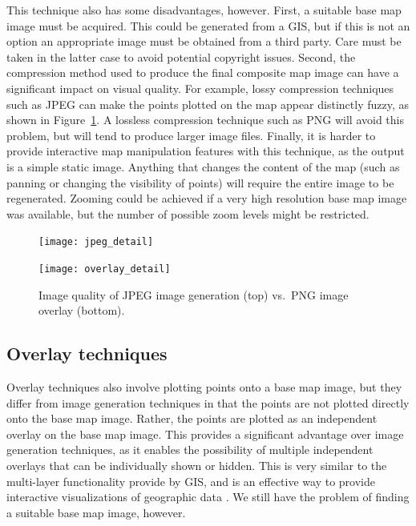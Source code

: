 \documentclass[acmtocl,acmnow]{acmtrans2m}
\begin{document}
This technique also has some disadvantages, however. First, a suitable
base map image must be acquired. This could be generated from a GIS, but
if this is not an option an appropriate image must be obtained from a
third party. Care must be taken in the latter case to avoid potential
copyright issues. Second, the compression method used to produce the
final composite map image can have a significant impact on visual
quality. For example, lossy compression techniques such as JPEG can make
the points plotted on the map appear distinctly fuzzy, as shown in
Figure~\ref{fig-image-quality}. A lossless compression technique such as
PNG will avoid this problem, but will tend to produce larger image
files. Finally, it is harder to provide interactive map manipulation
features with this technique, as the output is a simple static image.
Anything that changes the content of the map (such as panning or
changing the visibility of points) will require the entire image to be
regenerated. Zooming could be achieved if a very high resolution base
map image was available, but the number of possible zoom levels might be
restricted.


\begin{figure}
	\begin{center}
		\texttt{[image: jpeg\_detail]}\medskip
		
		\texttt{[image: overlay\_detail]}
	\end{center}
	\caption{Image quality of JPEG image generation (top) vs.\ PNG image
	overlay (bottom).}
	\label{fig-image-quality}
\end{figure}


\subsection{Overlay techniques}
\label{sec-html-overlay}


Overlay techniques also involve plotting points onto a base map image,
but they differ from image generation techniques in that the points are
not plotted directly onto the base map image. Rather, the points are
plotted as an independent overlay on the base map image. This provides a
significant advantage over image generation techniques, as it enables
the possibility of multiple independent overlays that can be
individually shown or hidden. This is very similar to the multi-layer
functionality provide by GIS, and is an effective way to provide
interactive visualizations of geographic data
\cite{Wood-J-1996-vis,MacE-AM-1998-GIS}. We still have the problem of
finding a suitable base map image, however.
\end{document}
